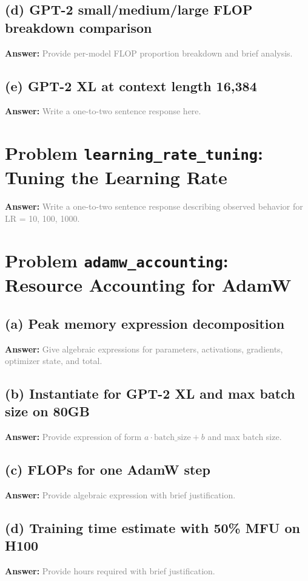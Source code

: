 \documentclass[11pt]{article}
\newcommand{\answer}{\textbf{Answer:} \vspace{1.5em}}
\newcommand{\placeholder}[1]{\textcolor{gray}{#1}}
\begin{document}
\subsection*{(d) GPT-2 small/medium/large FLOP breakdown comparison}
\answer
\placeholder{Provide per-model FLOP proportion breakdown and brief analysis.}

\subsection*{(e) GPT-2 XL at context length 16{,}384}
\answer
\placeholder{Write a one-to-two sentence response here.}

\section{Problem \texttt{learning\_rate\_tuning}: Tuning the Learning Rate}
\answer
\placeholder{Write a one-to-two sentence response describing observed behavior for LR = 10, 100, 1000.}

\section{Problem \texttt{adamw\_accounting}: Resource Accounting for AdamW}
\subsection*{(a) Peak memory expression decomposition}
\answer
\placeholder{Give algebraic expressions for parameters, activations, gradients, optimizer state, and total.}

\subsection*{(b) Instantiate for GPT-2 XL and max batch size on 80GB}
\answer
\placeholder{Provide expression of form $a \cdot \text{batch\_size} + b$ and max batch size.}

\subsection*{(c) FLOPs for one AdamW step}
\answer
\placeholder{Provide algebraic expression with brief justification.}

\subsection*{(d) Training time estimate with 50\% MFU on H100}
\answer
\placeholder{Provide hours required with brief justification.}
\end{document}
